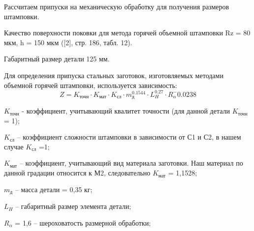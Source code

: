 Рассчитаем припуски на механическую обработку для получения размеров штамповки.

Качество поверхности поковки для метода горячей объемной штамповки Rz = 80 мкм, h = 150 мкм ([2], стр. 186, табл. 12).

Габаритный размер детали 125 мм.

Для определения припуска стальных заготовок, изготовляемых методами объемной горячей штамповки, используется зависимость:
$$Z = K_\text{точн} \cdot K_\text{мат} \cdot K_\text{сл} \cdot m_\text{д}^0.1544 \cdot L_H^0.27 \cdot R_\alpha^-0.0238 $$

$K_\text{точн}$ - коэффициент, учитывающий квалитет точности (для данной детали $K_\text{точн}$ = 1);

$K_\text{сл}$ – коэффициент сложности штамповки в зависимости от С1 и С2, в нашем случае $K_\text{сл}$ =1;

$K_\text{мат}$ – коэффициент, учитывающий вид материала заготовки. Наш материал по данной градации относится к М2, следовательно $K_\text{мат}$ = 1,1528;

$m_\text{д}$ – масса детали = 0,35 кг;

$L_H$ – габаритный размер элемента детали;

$R_\alpha $ = 1,6 – шероховатость размерной обработки;










